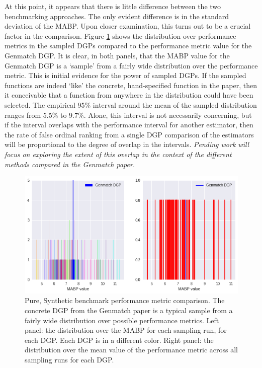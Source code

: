 \documentclass[../main.tex]{subfiles}
\begin{document}
At this point, it appears that there is little difference between the two benchmarking approaches. The only evident difference is in the standard deviation of the MABP. Upon closer examination, this turns out to be a crucial factor in the comparison. Figure \ref{fig:benchmark-validation-pure-synth-1} shows the distribution over performance metrics in the sampled DGPs compared to the performance metric value for the Genmatch DGP. It is clear, in both panels, that the MABP value for the Genmatch DGP is a `sample' from a fairly wide distribution over the performance metric. This is initial evidence for the power of sampled DGPs. If the sampled functions are indeed `like' the concrete, hand-specified function in the paper, then it conceivable that a function from anywhere in the distribution could have been selected. The empirical 95\% interval around the mean of the sampled distribution ranges from 5.5\% to 9.7\%. Alone, this interval is not necessarily concerning, but if the interval overlaps with the performance interval for another estimator, then the rate of false ordinal ranking from a single DGP comparison of the estimators will be proportional to the degree of overlap in the intervals. \textit{Pending work will focus on exploring the extent of this overlap in the context of the different methods compared in the Genmatch paper.}

\begin{figure}[ht!]
    \centering
    \includegraphics[width=1\linewidth]{figures/ch7-benchmark-pure-synth-1.png}
    \caption{Pure, Synthetic benchmark performance metric comparison. The concrete DGP from the Genmatch paper is a typical sample from a fairly wide distribution over possible performance metrics. Left panel: the distribution over the MABP for each sampling run, for each DGP. Each DGP is in a different color. Right panel: the distribution over the mean value of the performance metric across all sampling runs for each DGP.}
    \label{fig:benchmark-validation-pure-synth-1}
\end{figure}
\FloatBarrier
\end{document}
